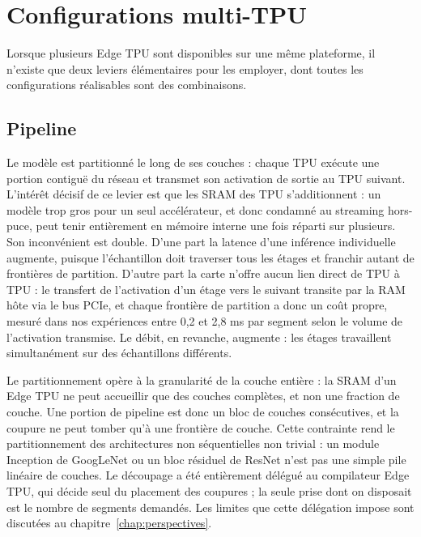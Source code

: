 \documentclass[11pt,a4paper]{report}
\begin{document}
\section{Configurations multi-TPU}
\label{sec:multitpu}

Lorsque plusieurs Edge TPU sont disponibles sur une même plateforme, il n'existe que deux leviers élémentaires pour les employer, dont toutes les configurations réalisables sont des combinaisons.

\subsection{Pipeline}

Le modèle est partitionné le long de ses couches \cite{villarrubiaImprovingInferenceTime2023} : chaque TPU exécute une portion contiguë du réseau et transmet son activation de sortie au TPU suivant. L'intérêt décisif de ce levier est que les SRAM des TPU s'additionnent : un modèle trop gros pour un seul accélérateur, et donc condamné au streaming hors-puce, peut tenir entièrement en mémoire interne une fois réparti sur plusieurs. Son inconvénient est double. D'une part la latence d'une inférence individuelle augmente, puisque l'échantillon doit traverser tous les étages et franchir autant de frontières de partition. D'autre part la carte n'offre aucun lien direct de TPU à TPU : le transfert de l'activation d'un étage vers le suivant transite par la RAM hôte via le bus PCIe, et chaque frontière de partition a donc un coût propre, mesuré dans nos expériences entre 0,2 et 2,8 ms par segment selon le volume de l'activation transmise. Le débit, en revanche, augmente : les étages travaillent simultanément sur des échantillons différents.

Le partitionnement opère à la granularité de la couche entière : la SRAM d'un Edge TPU ne peut accueillir que des couches complètes, et non une fraction de couche. Une portion de pipeline est donc un bloc de couches consécutives, et la coupure ne peut tomber qu'à une frontière de couche. Cette contrainte rend le partitionnement des architectures non séquentielles non trivial : un module Inception de GoogLeNet ou un bloc résiduel de ResNet n'est pas une simple pile linéaire de couches. Le découpage a été entièrement délégué au compilateur Edge TPU, qui décide seul du placement des coupures ; la seule prise dont on disposait est le nombre de segments demandés. Les limites que cette délégation impose sont discutées au chapitre~\ref{chap:perspectives}.
\end{document}
